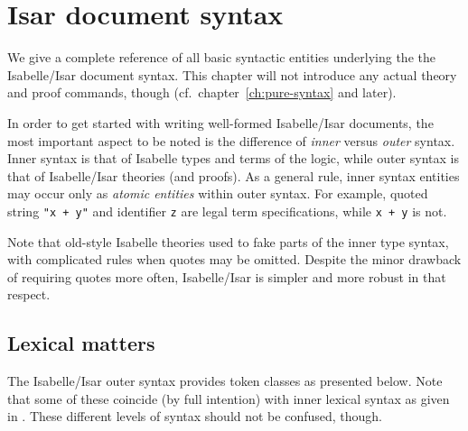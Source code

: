 
\chapter{Isar document syntax}

We give a complete reference of all basic syntactic entities underlying the
the Isabelle/Isar document syntax.  This chapter will not introduce any actual
theory and proof commands, though (cf.\ chapter~\ref{ch:pure-syntax} and
later).

\medskip

In order to get started with writing well-formed Isabelle/Isar documents, the
most important aspect to be noted is the difference of \emph{inner} versus
\emph{outer} syntax.  Inner syntax is that of Isabelle types and terms of the
logic, while outer syntax is that of Isabelle/Isar theories (and proofs).  As
a general rule, inner syntax entities may occur only as \emph{atomic entities}
within outer syntax.  For example, quoted string \texttt{"x + y"} and
identifier \texttt{z} are legal term specifications, while \texttt{x + y} is
not.

\begin{warn}
  Note that old-style Isabelle theories used to fake parts of the inner type
  syntax, with complicated rules when quotes may be omitted.  Despite the
  minor drawback of requiring quotes more often, Isabelle/Isar is simpler and
  more robust in that respect.
\end{warn}


\section{Lexical matters}\label{sec:lex-syntax}

The Isabelle/Isar outer syntax provides token classes as presented below.
Note that some of these coincide (by full intention) with inner lexical syntax
as given in \cite{isabelle-ref}.  These different levels of syntax should not
be confused, though.

